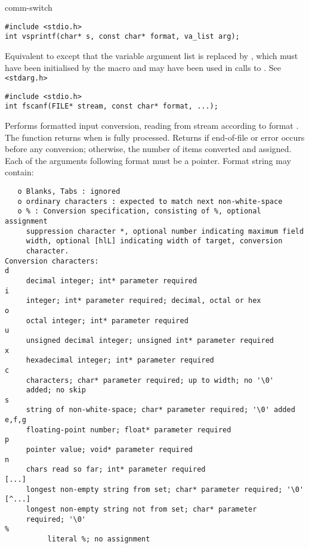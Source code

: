 \begin{Ventry2}{comm-switch  }
\item[vsprintf]
\label{item:vsprintf}
\begin{production}
\begin{verbatim}
#include <stdio.h>
int vsprintf(char* s, const char* format, va_list arg);
\end{verbatim}
\end{production}

     Equivalent to  except that the variable argument list is replaced
     by , which must have been initialised by the  macro and may
     have been used in calls to . See \verb+<stdarg.h>+

\item[fscanf]
\label{item:fscanf}
\begin{production}
\begin{verbatim}
#include <stdio.h>
int fscanf(FILE* stream, const char* format, ...);
\end{verbatim}
\end{production}

     Performs formatted input conversion, reading from stream  according
     to format . The function returns when  is fully processed.
     Returns  if end-of-file or error occurs before any conversion;
     otherwise, the number of items converted and assigned. Each of the
     arguments following format must be a pointer. Format string may contain:

\footnotesize
\begin{verbatim}
   o Blanks, Tabs : ignored
   o ordinary characters : expected to match next non-white-space
   o % : Conversion specification, consisting of %, optional assignment
     suppression character *, optional number indicating maximum field
     width, optional [hlL] indicating width of target, conversion
     character.
Conversion characters:
d
     decimal integer; int* parameter required
i
     integer; int* parameter required; decimal, octal or hex
o
     octal integer; int* parameter required
u
     unsigned decimal integer; unsigned int* parameter required
x
     hexadecimal integer; int* parameter required
c
     characters; char* parameter required; up to width; no '\0' 
     added; no skip
s
     string of non-white-space; char* parameter required; '\0' added
e,f,g
     floating-point number; float* parameter required
p
     pointer value; void* parameter required
n
     chars read so far; int* parameter required
[...]
     longest non-empty string from set; char* parameter required; '\0'
[^...]
     longest non-empty string not from set; char* parameter 
     required; '\0'
%
          literal %; no assignment
\end{verbatim}
\normalsize


\end{Ventry2}
